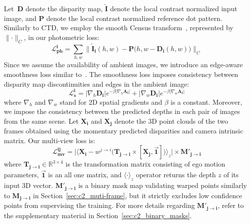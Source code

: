 Let~$\boldsymbol{D}$ denote the disparity map, $\boldsymbol{\tilde{I}}$ denote the local contrast normalized input image, and $\boldsymbol{P}$ denote the local contrast normalized reference dot pattern. Similarly to CTD, we employ the smooth Census transform~\citep{hafner2013census}, represented by $\parallel \cdot \parallel_{C}$, in our photometric loss:
\begin{equation}\label{eqn:photometric}
    \boldsymbol{\mathcal{L}^{i}_{ph}}=\sum_{h,w} \parallel \boldsymbol{\tilde{I}_i}(h,w) - \boldsymbol{P}\big(h,w - \boldsymbol{D_{i}}(h,w)\big) \parallel_{C}
\end{equation}
Since we assume the availability of ambient images, we introduce an edge-aware smoothness loss similar to~\cite{godard2017unsupervised,godard2019digging}. The smoothness loss imposes consistency between disparity map discontinuities and edges in the ambient image:
\begin{equation}
    \boldsymbol{\mathcal{L}^{i}_{s}}= |\nabla_{h} \boldsymbol{D_{i}}|e^{-\beta|\nabla_{h} \boldsymbol{A_{i}}|}
    +
    |\nabla_{w} \boldsymbol{D_{i}}|e^{-\beta|\nabla_{w} \boldsymbol{A_{i}}|}
\end{equation}
where $\nabla_{h}$ and $\nabla_{w}$ stand for 2D spatial gradients and $\beta$ is a constant. Moreover, we impose the consistency between the predicted depths in each pair of images from the same scene. Let $\boldsymbol{X_{i}}$ and $\boldsymbol{X_{j}}$ denote the 3D point clouds of the two frames obtained using the momentary predicted disparities and camera intrinsic matrix. Our multi-view loss is:
\begin{equation}
    \boldsymbol{\mathcal{L}^{ij}_{mv}}=
    \bigg|
    \Big \langle \boldsymbol{X_{i}} -
    w^{j \rightarrow i}
    \big( \boldsymbol{T_{j \rightarrow i}} \times [\boldsymbol{X_{j}},\vec{\mathbf{1}}] \big) \Big \rangle_z
    \bigg| \times \boldsymbol{M'_{j \rightarrow i}}
\end{equation}
where $\boldsymbol{T_{j \rightarrow i}} \in \mathbb{R}^{3 \times 4}$ is the transformation matrix consisting of ego motion parameters, $\vec{\mathbf{1}}$ is an all one matrix, and $\langle\cdot\rangle_z$ operator returns the depth $z$ of its input 3D vector. $\boldsymbol{M'_{j \rightarrow i}}$ is a binary mask map validating warped points similarly to $\boldsymbol{M_{j \rightarrow i}}$ in Section~\ref{sec:c2_muti-frame}, but it strictly excludes low confidence points from supervising the training. For more details regarding $\boldsymbol{M'_{j \rightarrow i}}$, refer to the supplementary material in Section~\ref{sec:c2_binary_masks}.

